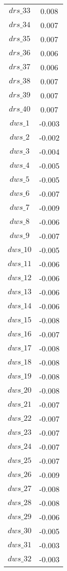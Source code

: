 \begin{center}
\begin{longtable}{cc}
$drs\_33$ 	 & 	 0.008 \\
$drs\_34$ 	 & 	 0.007 \\
$drs\_35$ 	 & 	 0.007 \\
$drs\_36$ 	 & 	 0.006 \\
$drs\_37$ 	 & 	 0.006 \\
$drs\_38$ 	 & 	 0.007 \\
$drs\_39$ 	 & 	 0.007 \\
$drs\_40$ 	 & 	 0.007 \\
$dws\_1$ 	 & 	 -0.003 \\
$dws\_2$ 	 & 	 -0.002 \\
$dws\_3$ 	 & 	 -0.004 \\
$dws\_4$ 	 & 	 -0.005 \\
$dws\_5$ 	 & 	 -0.005 \\
$dws\_6$ 	 & 	 -0.007 \\
$dws\_7$ 	 & 	 -0.009 \\
$dws\_8$ 	 & 	 -0.006 \\
$dws\_9$ 	 & 	 -0.007 \\
$dws\_10$ 	 & 	 -0.005 \\
$dws\_11$ 	 & 	 -0.006 \\
$dws\_12$ 	 & 	 -0.006 \\
$dws\_13$ 	 & 	 -0.006 \\
$dws\_14$ 	 & 	 -0.006 \\
$dws\_15$ 	 & 	 -0.008 \\
$dws\_16$ 	 & 	 -0.007 \\
$dws\_17$ 	 & 	 -0.008 \\
$dws\_18$ 	 & 	 -0.008 \\
$dws\_19$ 	 & 	 -0.008 \\
$dws\_20$ 	 & 	 -0.008 \\
$dws\_21$ 	 & 	 -0.007 \\
$dws\_22$ 	 & 	 -0.007 \\
$dws\_23$ 	 & 	 -0.007 \\
$dws\_24$ 	 & 	 -0.007 \\
$dws\_25$ 	 & 	 -0.007 \\
$dws\_26$ 	 & 	 -0.009 \\
$dws\_27$ 	 & 	 -0.008 \\
$dws\_28$ 	 & 	 -0.008 \\
$dws\_29$ 	 & 	 -0.006 \\
$dws\_30$ 	 & 	 -0.005 \\
$dws\_31$ 	 & 	 -0.003 \\
$dws\_32$ 	 & 	 -0.003 \\

\end{longtable}
\end{center}
